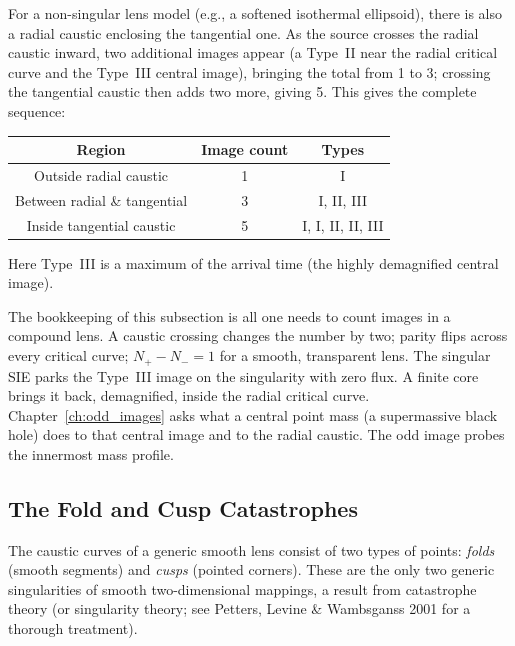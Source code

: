 For a non-singular lens model (e.g., a softened isothermal
ellipsoid), there is also a radial caustic enclosing the
tangential one.  As the source crosses the radial caustic inward,
two additional images appear (a Type~II near the radial critical
curve and the Type~III central image), bringing the total from 1
to 3; crossing the tangential caustic then adds two more, giving 5.
This gives the complete sequence:
\begin{center}
\begin{tabular}{ccc}
\toprule
\textbf{Region} & \textbf{Image count} & \textbf{Types} \\
\midrule
Outside radial caustic & 1 & I \\
Between radial \& tangential & 3 & I, II, III \\
Inside tangential caustic & 5 & I, I, II, II, III \\
\bottomrule
\end{tabular}
\end{center}
Here Type~III is a maximum of the arrival time (the highly
demagnified central image).

\begin{bridge}
The bookkeeping of this subsection is all one needs to count images in a
compound lens.  A caustic crossing changes the number by two; parity flips
across every critical curve; $N_+ - N_- = 1$ for a smooth, transparent lens.
The singular SIE parks the Type~III image on the singularity with zero flux.
A finite core brings it back, demagnified, inside the radial critical curve.
Chapter~\ref{ch:odd_images} asks what a central point mass (a supermassive
black hole) does to that central image and to the radial caustic.  The odd
image probes the innermost mass profile.
\end{bridge}



\subsection{The Fold and Cusp Catastrophes}
\label{sec:fold_cusp}

The caustic curves of a generic smooth lens consist of two types of
points: \emph{folds} (smooth segments) and \emph{cusps} (pointed
corners).  These are the only two generic singularities of smooth
two-dimensional mappings, a result from catastrophe theory
(or singularity theory; see Petters, Levine \& Wambsganss 2001 for
a thorough treatment).

